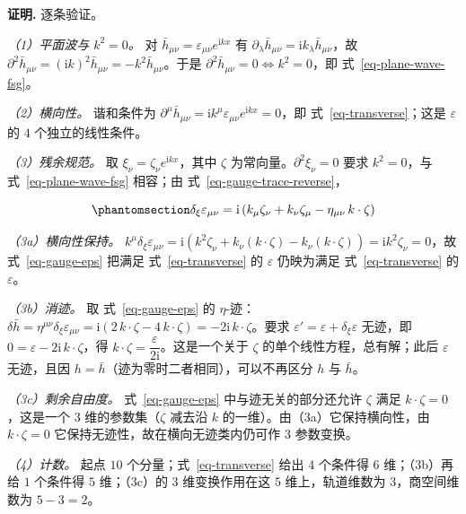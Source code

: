 \documentclass[
  chinese,
  a4paper,
  UTF8,
  12pt,
  oneside,
  openany]{ctexbook}
\theoremstyle{plain}
\theoremstyle{plain}
\theoremstyle{plain}
\theoremstyle{definition}
\theoremstyle{plain}
\theoremstyle{plain}
\theoremstyle{remark}
\begin{document}
\textbf{证明.} 逐条验证。

\emph{（1）平面波与 \(k^{2}=0\)。} 对
\(\bar h_{\mu\nu}=\varepsilon_{\mu\nu}e^{\mathrm{i}kx}\) 有
\(\partial_{\lambda}\bar h_{\mu\nu}=\mathrm{i}k_{\lambda}\bar h_{\mu\nu}\)，故
\(\partial^{2}\bar h_{\mu\nu}=(\mathrm{i}k)^{2}\bar h_{\mu\nu}=-k^{2}\bar h_{\mu\nu}\)。于是
\(\partial^{2}\bar h_{\mu\nu}=0\iff k^{2}=0\)，即
式~\ref{eq-plane-wave-fsg}。

\emph{（2）横向性。} 谐和条件为
\(\partial^{\mu}\bar h_{\mu\nu}=\mathrm{i}k^{\mu}\varepsilon_{\mu\nu}e^{\mathrm{i}kx}=0\)，即
式~\ref{eq-transverse}；这是 \(\varepsilon\) 的 \(4\) 个独立的线性条件。

\emph{（3）残余规范。} 取
\(\xi_{\nu}=\zeta_{\nu}e^{\mathrm{i}kx}\)，其中 \(\zeta\)
为常向量。\(\partial^{2}\xi_{\nu}=0\) 要求 \(k^{2}=0\)，与
式~\ref{eq-plane-wave-fsg} 相容；由 式~\ref{eq-gauge-trace-reverse}，

\begin{equation}\protect\phantomsection\label{eq-gauge-eps}{
\delta_{\xi}\varepsilon_{\mu\nu}
= \mathrm{i}\left(k_{\mu}\zeta_{\nu}+k_{\nu}\zeta_{\mu}-\eta_{\mu\nu}\,k\cdot\zeta\right)
}\end{equation}

\emph{（3a）横向性保持。}
\(k^{\mu}\delta_{\xi}\varepsilon_{\mu\nu}=\mathrm{i}\left(k^{2}\zeta_{\nu}+k_{\nu}(k\cdot\zeta)-k_{\nu}(k\cdot\zeta)\right)=\mathrm{i}k^{2}\zeta_{\nu}=0\)，故
式~\ref{eq-gauge-eps} 把满足 式~\ref{eq-transverse} 的 \(\varepsilon\)
仍映为满足 式~\ref{eq-transverse} 的 \(\varepsilon\)。

\emph{（3b）消迹。} 取 式~\ref{eq-gauge-eps} 的
\(\eta\)-迹：\(\delta\bar h=\eta^{\mu\nu}\delta_{\xi}\varepsilon_{\mu\nu}=\mathrm{i}\left(2\,k\cdot\zeta-4\,k\cdot\zeta\right)=-2\mathrm{i}\,k\cdot\zeta\)。要求
\(\varepsilon'=\varepsilon+\delta_{\xi}\varepsilon\) 无迹，即
\(0=\varepsilon-2\mathrm{i}\,k\cdot\zeta\)，得
\(k\cdot\zeta=\dfrac{\varepsilon}{2\mathrm{i}}\)。这是一个关于 \(\zeta\)
的单个线性方程，总有解；此后 \(\varepsilon\) 无迹，且因
\(h=\bar h\)（迹为零时二者相同），可以不再区分 \(h\) 与 \(\bar h\)。

\emph{（3c）剩余自由度。} 式~\ref{eq-gauge-eps} 中与迹无关的部分还允许
\(\zeta\) 满足 \(k\cdot\zeta=0\)，这是一个 \(3\) 维的参数集（\(\zeta\)
减去沿 \(k\) 的一维）。由（3a）它保持横向性，由 \(k\cdot\zeta=0\)
它保持无迹性，故在横向无迹类内仍可作 \(3\) 参数变换。

\emph{（4）计数。} 起点 \(10\) 个分量；式~\ref{eq-transverse} 给出 \(4\)
个条件得 \(6\) 维；（3b）再给 \(1\) 个条件得 \(5\) 维；（3c）的 \(3\)
维变换作用在这 \(5\) 维上，轨道维数为 \(3\)，商空间维数为 \(5-3=2\)。
\end{document}
